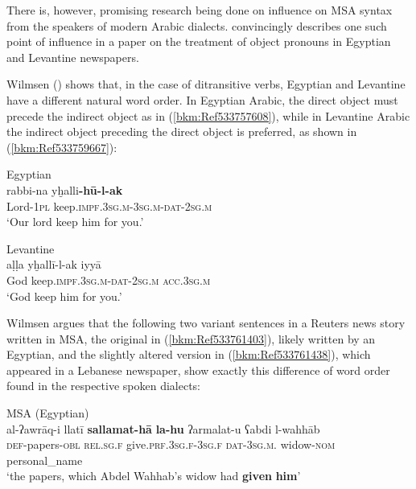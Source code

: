 \documentclass[output=paper]{langsci/langscibook}
\begin{document}
There is, however, promising research being done on influence on MSA syntax from the speakers of modern Arabic dialects. \citet{Wilmsen2010} convincingly describes one such point of influence in a paper on the treatment of object pronouns in Egyptian and Levantine newspapers.

Wilmsen (\citeyear[104]{Wilmsen2010}) shows that, in the case of ditransitive verbs, Egyptian and Levantine have a different natural word order. In Egyptian Arabic, the direct object must precede the indirect object as in (\ref{bkm:Ref533757608}), while in Levantine Arabic the indirect object preceding the direct object is preferred, as shown in (\ref{bkm:Ref533759667}):

\ea
\label{bkm:Ref533757608}Egyptian\\
\gll rabbi-na yḫalli\textbf{{}-hū-l-ak}\\
     Lord-\textsc{1pl} keep\textsc{.impf.3sg.m}{}-3\textsc{sg.m-dat-2sg.m}\\
\glt ‘Our lord keep him for you.’
\z

\ea\label{bkm:Ref533759667}Levantine\\
\gll aḷḷa yḫallī-l-ak iyyā\\
     God keep\textsc{.impf.3sg.m-dat-2sg.m} \textsc{acc.}3\textsc{sg.m} \\
\glt ‘God keep him for you.’\z

Wilmsen argues that the following two variant sentences in a Reuters news story written in MSA, the original in (\ref{bkm:Ref533761403}), likely written by an Egyptian, and the slightly altered version in (\ref{bkm:Ref533761438}), which appeared in a Lebanese newspaper, show exactly this difference of word order found in the respective spoken dialects:

\ea
\label{bkm:Ref533761403}MSA (Egyptian)\\
\gll al-ʔawrāq-i llatī \textbf{sallamat-hā} \textbf{la-hu} ʔarmalat-u ʕabdi l-wahhāb\\
     \textsc{def}{}-papers-\textsc{obl} \textsc{rel.sg.f} give.\textsc{prf.3sg.f-3sg.f} \textsc{dat-3sg.m.} widow-\textsc{nom} personal\_name\\
     \glt ‘the papers, which Abdel Wahhab’s widow had \textbf{given} \textbf{him}’
\z

\end{document}
